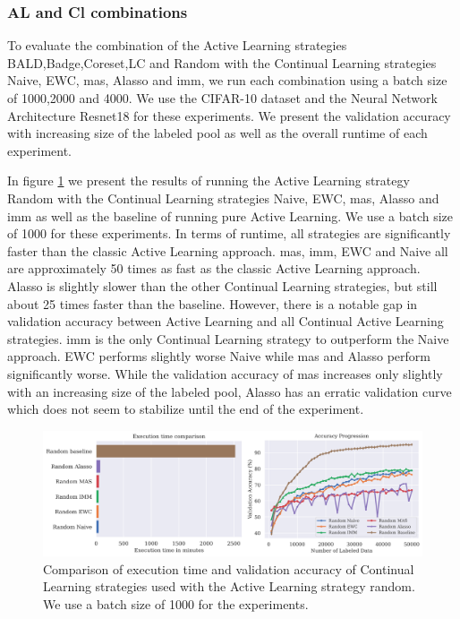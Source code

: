 \subsubsection{AL and Cl combinations}
\label{sec:Evaluation:Results:CAL:ALCL}
To evaluate the combination of the Active Learning strategies BALD,Badge,Coreset,LC and Random with the Continual Learning strategies Naive, EWC, \gls{mas}, Alasso and \gls{imm}, we run each combination
using a batch size of 1000,2000 and 4000. We use the CIFAR-10 dataset and the Neural Network Architecture Resnet18 for these experiments. We present the validation accuracy with increasing
size of the labeled pool as well as the overall runtime of each experiment. \par
In figure \ref{fig:Evaluation:Results:CAL:Random1000} we present the results of running the Active Learning strategy Random with the Continual Learning strategies Naive, EWC, \gls{mas}, Alasso and \gls{imm}
as well as the baseline of running pure Active Learning. We use a batch size of 1000 for these experiments. In terms of runtime, all strategies are significantly faster than the classic Active
Learning approach. \gls{mas}, \gls{imm}, EWC and Naive all are approximately 50 times as fast as the classic Active Learning approach. Alasso is slightly slower than the other Continual Learning strategies,
but still about 25 times faster than the baseline. However, there is a notable gap in validation accuracy between Active Learning and all Continual Active Learning strategies. \gls{imm} is the only
Continual Learning strategy to outperform the Naive approach. EWC performs slightly worse Naive while \gls{mas} and Alasso perform significantly worse. While the validation accuracy of \gls{mas} increases only
slightly with an increasing size of the labeled pool, Alasso has an erratic validation curve which does not seem to stabilize until the end of the experiment. \par
\begin{figure}[h]
    \centering
    \includegraphics[width=\linewidth]{images/results_CAL/Random_CAL_1000b.png}
    \caption[Continual Active Learning Random 1000 batch size]{Comparison of execution time and validation accuracy of Continual Learning strategies used with the Active Learning strategy random.
    We use a batch size of 1000 for the experiments.}
    \label{fig:Evaluation:Results:CAL:Random1000}
\end{figure}

